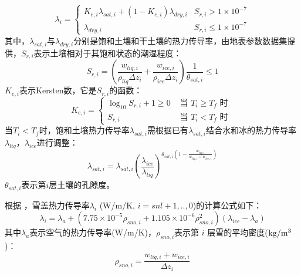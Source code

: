 \begin{equation}
\lambda_{i}=\left\{\begin{array}{ll}K_{e, i} \lambda_{sat, i}+\left(1-K_{e, i}\right) \lambda_{d r y, i} & S_{r, i}>1 \times 10^{-7} \\ \lambda_{d r y, i} & S_{r, i} \leq 1 \times10^{-7}\end{array}\right.
\end{equation}
其中，$\lambda_{sat,i}$与$\lambda_{dry,i}$分别是饱和土壤和干土壤的热力传导率，由地表参数数据集提供，$S_{r,i}$表示土壤相对于其饱和状态的潮湿程度：
\begin{equation}
S_{r, i}=\left(\frac{w_{liq, i}}{\rho_{liq} \Delta z_{i}}+\frac{w_{ice, i}}{\rho_{ice} \Delta z_{i}}\right) \frac{1}{\theta_{sat, i}} \leq 1
\end{equation}
$K_{e,i}$表示Kersten数，它是$S_{r,i}$的函数：
\begin{equation}
K_{e, i}=\left\{\begin{array}{ll}\log _{10} S_{r, i}+1 \geq 0 & \text{ 当 } T_{i} \geq T_{f} \text{ 时 } \\ S_{r, i} & \text{ 当 } T_{i}<T_{f} \text{ 时 }\end{array}\right.
\end{equation}
当$T_i<T_f$时，饱和土壤热力传导率$\lambda_{sat,i}$需根据已有$\lambda_{sat,i}$结合水和冰的热力传导率$\lambda_{liq}$，$\lambda_{ice}$进行调整：
\begin{equation}
\lambda_{sat, i}=\lambda_{sat, i}\left(\frac{\lambda_{ice}}{\lambda_{liq}}\right)^{\theta_{sat, i}\left(1-\frac{w_{liq, i}}{w_{liq, i}+w_{ice, i}}\right)}
\end{equation}
$\theta_{sat, i}$表示第$ i $层土壤的孔隙度。


根据 \citet{jordan1991one}，雪盖热力传导率$\lambda_i$ (W/m/K, $i=snl+1,..,0$)的计算公式如下：
\begin{equation}
\lambda_{i}=\lambda_{a}+\left(7.75 \times 10^{-5} \rho_{sno, i}+1.105 \times 10^{-6} \rho_{sno, i}^{2}\right)\left(\lambda_{ice}-\lambda_{a}\right)
\end{equation}
其中$\lambda_a$表示空气的热力传导率(W/m/K)，$\rho_{sno,i}$表示第 $i$ 层雪的平均密度($\rm kg/m^3$)：
\begin{equation}
\rho_{sno, i}=\frac{w_{liq, i}+w_{ice, i}}{\Delta z_{i}}
\end{equation}



